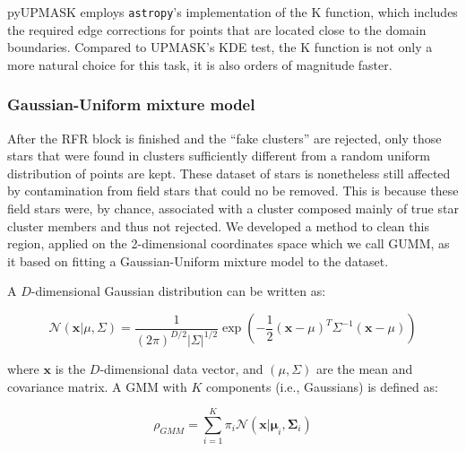 \documentclass[draft]{aa}
\begin{document}
 pyUPMASK employs \texttt{astropy}'s implementation of the K function, which
 includes the required edge corrections for points that are located close to
 the domain boundaries. Compared to UPMASK's KDE test, the K function is not
 only a more natural choice for this task, it is also orders of magnitude
 faster.



\subsubsection{Gaussian-Uniform mixture model}
 \label{sssec:gumm}

 After the RFR block is finished and the ``fake clusters'' are rejected, only
 those stars that were found in clusters sufficiently different from a random
 uniform distribution of points are kept. These dataset of stars is
 nonetheless still affected by contamination from field stars that could no be
 removed. This is because these field stars were, by chance, associated with a
 cluster composed mainly of true star cluster members and thus not rejected.
 We developed a method to clean this region, applied on the 2-dimensional
 coordinates space which we call GUMM, as it based on fitting a
 Gaussian-Uniform mixture model to the dataset.

 A $D$-dimensional Gaussian distribution can be written as:

 \begin{equation}
 \mathcal{N}(\mathbf{x} | \mu, \Sigma)=
 \frac{1}{(2 \pi)^{D / 2}|\Sigma|^{1 / 2}}
 \exp \left(-\frac{1}{2}(\mathbf{x}-\mu)^{T} \Sigma^{-1}(\mathbf{x}-\mu)\right)
 \end{equation}

 \noindent where $\mathbf{x}$ is the $D$-dimensional data vector, and $
 (\mu,\Sigma)$ are the mean and covariance matrix.
 A GMM with $K$ components (i.e., Gaussians) is defined as:

 \begin{equation}
 \rho_{GMM}=\sum_{i=1}^{K} \pi_{i}
 \mathcal{N}\left(\boldsymbol{\mathbf{x} | \mu}_{i}, \boldsymbol{\Sigma}_{i}\right)
 \end{equation}
\end{document}
